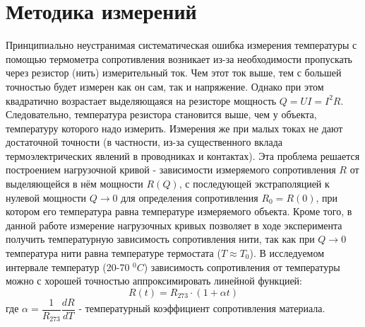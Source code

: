 \documentclass[a4paper, 12pt]{article}%
\begin{document}
\section*{Методика измерений} 
Принципиально неустранимая систематическая ошибка измерения температуры с помощью термометра сопротивления возникает из-за необходимости пропускать через резистор (нить) измерительный ток. Чем этот ток выше, тем с большей точностью будет измерен как он сам, так и напряжение. Однако при этом квадратично возрастает выделяющаяся на  резисторе мощность $Q = UI = I^2R$. Следовательно, температура резистора становится выше, чем у объекта, температуру которого надо измерить. Измерения же при малых токах не дают достаточной точности (в частности, из-за существенного вклада термоэлектрических явлений в проводниках и контактах). Эта проблема решается построением нагрузочной кривой - зависимости измеряемого сопротивления $R$ от выделяющейся в нём мощности $R(Q)$, с последующей экстраполяцией к нулевой мощности $Q \to 0$ для определения сопротивления $R_0 = R(0)$, при котором его температура равна температуре измеряемого объекта. Кроме того, в данной работе измерение нагрузочных кривых позволяет в ходе эксперимента получить температурную зависимость сопротивления нити, так как при $Q \to 0$ температура нити равна температуре термостата ($T \approx T_0$). В исследуемом интервале температур (20-70 $^0C$) зависимость сопротивления от температуры можно с хорошей точностью аппроксимировать линейной функцией:
\[R(t) = R_{273} \cdot (1 + \alpha t)\]
где $\alpha = \dfrac{1}{R_{273}} \dfrac{dR}{dT}$ - температурный коэффициент сопротивления материала.
\end{document}
